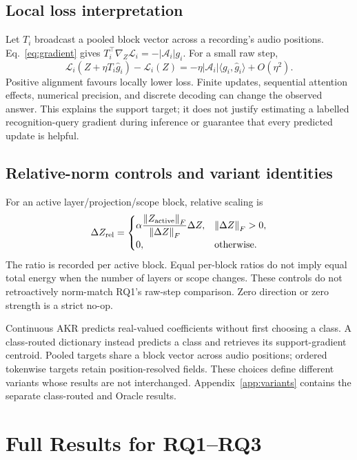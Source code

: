 \documentclass{article}
\newcommand{\Aset}{\mathcal A}
\newcommand{\norm}[1]{\left\lVert#1\right\rVert}
\begin{document}
\subsection{Local loss interpretation}
Let $T_i$ broadcast a pooled block vector across a recording's audio positions. Eq.~\ref{eq:gradient} gives $T_i^\top\nabla_Z\mathcal L_i=-|\Aset_i|g_i$. For a small raw step,
\begin{equation}
\mathcal L_i(Z+\eta T_i\widehat g_i)-\mathcal L_i(Z)
=-\eta|\Aset_i|\langle g_i,\widehat g_i\rangle+O(\eta^2).
\label{eq:local}
\end{equation}
Positive alignment favours locally lower loss. Finite updates, sequential attention effects, numerical precision, and discrete decoding can change the observed answer. This explains the support target; it does not justify estimating a labelled recognition-query gradient during inference or guarantee that every predicted update is helpful.

\subsection{Relative-norm controls and variant identities}
For an active layer/projection/scope block, relative scaling is
\begin{equation}
\Delta Z_{\rm rel}=
\begin{cases}
\displaystyle\alpha\frac{\norm{Z_{\rm active}}_F}{\norm{\Delta Z}_F}\Delta Z,
&\norm{\Delta Z}_F>0,\\[3pt]
0,&\text{otherwise}.
\end{cases}
\label{eq:relative}
\end{equation}
The ratio is recorded per active block. Equal per-block ratios do not imply equal total energy when the number of layers or scope changes. These controls do not retroactively norm-match RQ1's raw-step comparison. Zero direction or zero strength is a strict no-op.

Continuous AKR predicts real-valued coefficients without first choosing a class. A class-routed dictionary instead predicts a class and retrieves its support-gradient centroid. Pooled targets share a block vector across audio positions; ordered tokenwise targets retain position-resolved fields. These choices define different variants whose results are not interchanged. Appendix~\ref{app:variants} contains the separate class-routed and Oracle results.

\clearpage
\section{Full Results for RQ1--RQ3}
\label{app:fullresults}
\end{document}
